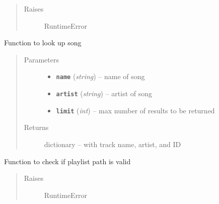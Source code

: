 \documentclass[letterpaper,10pt,english]{sphinxmanual}
\begin{document}
\begin{fulllineitems}
\begin{fulllineitems}
\begin{quote}
\begin{description}
\item[{Raises}] \leavevmode
RuntimeError

\end{description}\end{quote}

\end{fulllineitems}


\begin{fulllineitems}
\label{index:gitsound.SpotifyUser.song_lookup}
Function to look up song
\begin{quote}\begin{description}
\item[{Parameters}] \leavevmode\begin{itemize}
\item {} 
\textbf{\texttt{name}} (\emph{string}) -- name of song

\item {} 
\textbf{\texttt{artist}} (\emph{string}) -- artist of song

\item {} 
\textbf{\texttt{limit}} (\emph{int}) -- max number of results to be returned

\end{itemize}

\item[{Returns}] \leavevmode
dictionary -- with track name, artist, and ID

\end{description}\end{quote}

\end{fulllineitems}


\end{fulllineitems}

\label{index:module-util}

\begin{fulllineitems}
\label{index:util.check_if_git_playlist}
Function to check if playlist path is valid
\begin{quote}\begin{description}
\item[{Raises}] \leavevmode
RuntimeError

\end{description}\end{quote}

\end{fulllineitems}
\end{document}
